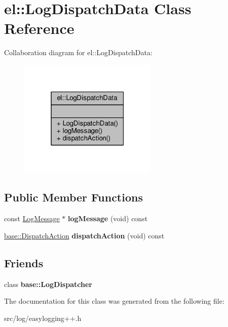 \hypertarget{classel_1_1LogDispatchData}{}\section{el\+:\+:Log\+Dispatch\+Data Class Reference}
\label{classel_1_1LogDispatchData}


Collaboration diagram for el\+:\+:Log\+Dispatch\+Data\+:
\nopagebreak
\begin{figure}[H]
\begin{center}
\leavevmode
\includegraphics[width=187pt]{d5/d20/classel_1_1LogDispatchData__coll__graph}
\end{center}
\end{figure}
\subsection*{Public Member Functions}
\begin{DoxyCompactItemize}
\item 
const \hyperlink{classel_1_1LogMessage}{Log\+Message} $\ast$ {\bfseries log\+Message} (void) const \hypertarget{classel_1_1LogDispatchData_ad52d4ddc330b6260bf10e9879a653829}{}\label{classel_1_1LogDispatchData_ad52d4ddc330b6260bf10e9879a653829}

\item 
\hyperlink{namespaceel_1_1base_a3aa2563d38e47388ba242a1694fc2839}{base\+::\+Dispatch\+Action} {\bfseries dispatch\+Action} (void) const \hypertarget{classel_1_1LogDispatchData_aee0808c660aa39b34ee69850a2c74c09}{}\label{classel_1_1LogDispatchData_aee0808c660aa39b34ee69850a2c74c09}

\end{DoxyCompactItemize}
\subsection*{Friends}
\begin{DoxyCompactItemize}
\item 
class {\bfseries base\+::\+Log\+Dispatcher}\hypertarget{classel_1_1LogDispatchData_a84d22f9ad5b796e49ff5f15a8c32773d}{}\label{classel_1_1LogDispatchData_a84d22f9ad5b796e49ff5f15a8c32773d}

\end{DoxyCompactItemize}


The documentation for this class was generated from the following file\+:\begin{DoxyCompactItemize}
\item 
src/log/easylogging++.\+h\end{DoxyCompactItemize}
